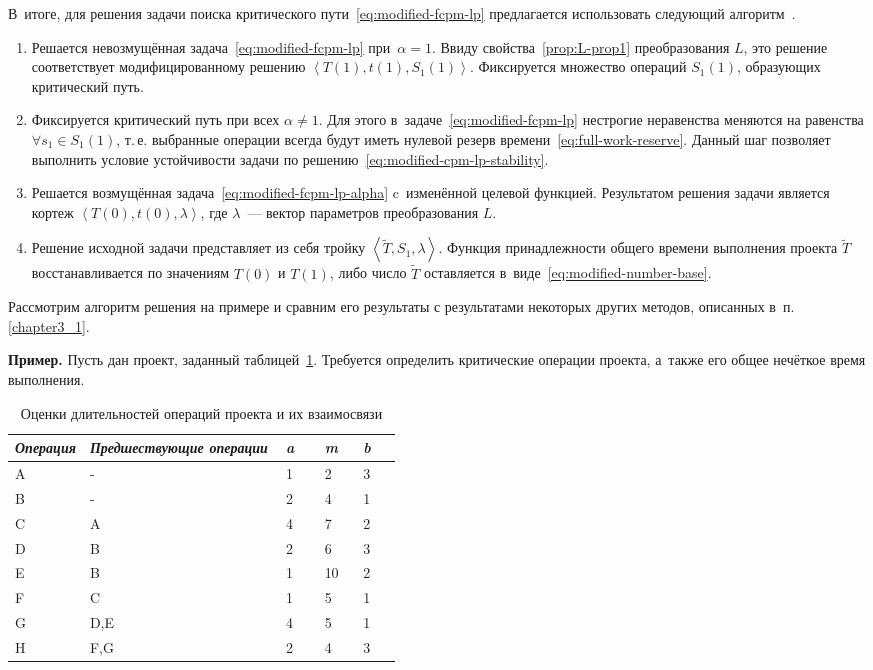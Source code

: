 В~итоге, для решения задачи поиска критического пути~\eqref{eq:modified-fcpm-lp} предлагается использовать следующий алгоритм~\cite{Vorontsov_VSTU}.
\begin{enumerate}
  \item Решается невозмущённая задача~\eqref{eq:modified-fcpm-lp} при~$\alpha=1$. Ввиду свойства~\ref{prop:L-prop1} преобразования $L$, это решение соответствует модифицированному решению $\left \langle T\left(1\right), t\left(1\right), S_1\left(1\right) \right \rangle$. Фиксируется множество операций $S_1\left(1\right)$, образующих критический путь.
  \item Фиксируется критический путь при всех $\alpha \neq 1$. Для этого в~задаче~\eqref{eq:modified-fcpm-lp} нестрогие неравенства меняются на равенства $\forall s_1 \in S_1\left(1\right)$, т.\,е. выбранные операции всегда будут иметь нулевой резерв времени~\eqref{eq:full-work-reserve}. Данный шаг позволяет выполнить условие устойчивости задачи по решению~\eqref{eq:modified-cpm-lp-stability}.
  \item Решается возмущённая задача~\eqref{eq:modified-fcpm-lp-alpha} c~изменённой целевой функцией. Результатом решения задачи является кортеж $\left \langle T\left(0\right), t\left(0\right), \lambda \right \rangle$, где $\lambda$~--- вектор параметров преобразования $L$.
  \item Решение исходной задачи представляет из себя тройку $\left \langle \tilde T, S_1, \lambda \right \rangle$. Функция принадлежности общего времени выполнения проекта $\tilde T$ восстанавливается по значениям $T\left(0\right)$ и $T\left(1\right)$, либо число $\tilde T$ оставляется в~виде~\eqref{eq:modified-number-base}.
\end{enumerate}
  
Рассмотрим алгоритм решения на примере и сравним его результаты с результатами некоторых других методов, описанных в~п.\,\ref{chapter3_1}.

\textbf{Пример.} Пусть дан проект, заданный таблицей~\ref{t:sample-project-estimates}. Требуется определить критические операции проекта, а~также его общее нечёткое время выполнения.

\begin{table}[b!]
\caption{Оценки длительностей операций проекта и их взаимосвязи}
\label{t:sample-project-estimates}
\begin{center}
\begin{tabularx}{0.8\textwidth}{|p{0.15\linewidth}|X|p{0.1\linewidth}|p{0.1\linewidth}|p{0.1\linewidth}|}
	\hline
		\centering \textit{Операция} & \centering \textit{Предшествующие операции} & \centering \textit{a} & \centering \textit{m} & \centering \textit{b} \tabularnewline	\hline
	\hline
		A & -   & 1 & 2  & 3 \tabularnewline \hline
		B & -   & 2 & 4  & 1 \tabularnewline \hline
		C & A   & 4 & 7  & 2 \tabularnewline \hline
		D & B   & 2 & 6  & 3 \tabularnewline \hline
		E & B   & 1 & 10 & 2 \tabularnewline \hline
		F & C   & 1 & 5  & 1 \tabularnewline \hline
		G & D,E & 4 & 5  & 1 \tabularnewline \hline
		H & F,G & 2 & 4  & 3 \tabularnewline
    \hline
\end{tabularx}
\end{center}
\end{table}

